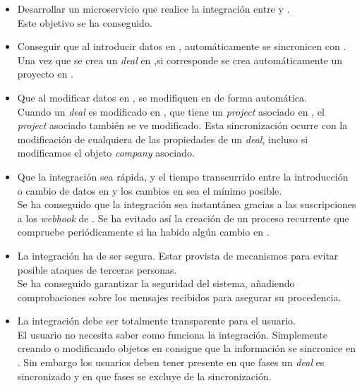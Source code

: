 \begin{itemize}
	\item Desarrollar un microservicio que realice la integración entre \hs{} y \wday{}.\\
	
		Este objetivo se ha conseguido.
	\item Conseguir que al introducir datos en \hs{}, automáticamente se sincronicen con \wday{}.\\
	
	Una vez que se crea un \textit{deal} en \hs{},si corresponde se crea automáticamente un proyecto en \wday{}.
	
	\item Que al modificar datos en \hs{}, se modifiquen en \wday{} de forma automática.\\
	
	Cuando un \textit{deal} es modificado en \hs{}, que tiene un \textit{project} asociado en \wday{}, el \textit{project} asociado también se ve modificado. Esta sincronización ocurre con la modificación de cualquiera de las propiedades de un \textit{deal}, incluso si modificamos el objeto \textit{company} asociado.
	
	\item Que la integración sea rápida, y el tiempo transcurrido entre la introducción o cambio de datos en \hs{} y los cambios en \wday{} sea el mínimo posible.\\
	Se ha conseguido que la integración sea instantánea gracias a las suscripciones a los \textit{webhook} de \hs{}. 
	Se ha evitado así la creación de un proceso recurrente que compruebe periódicamente si ha habido algún cambio en \hs{}. 
	
	\item La integración ha de ser segura. Estar provista de mecanismos para evitar posible ataques de terceras personas.\\
	
	Se ha conseguido garantizar la seguridad del sistema, añadiendo comprobaciones sobre los mensajes recibidos para asegurar su procedencia.
	
	\item La integración debe ser totalmente transparente para el usuario.\\
	
	El usuario no necesita saber como funciona la integración. Simplemente creando o modificando objetos en \hs{} consigue que la información se sincronice en \wday{}.
	Sin embargo los usuarios deben tener presente en que fases un \textit{deal} es sincronizado y en que fases se excluye de la sincronización.
	

\end{itemize}
